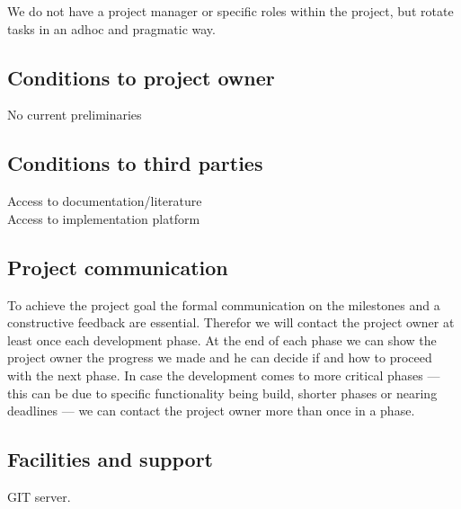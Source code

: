 \documentclass{article}
\begin{document}
We do not have a project manager or specific roles within the project, but
rotate tasks in an adhoc and pragmatic way.

\subsection{Conditions to project owner}
No current preliminaries

\subsection{Conditions to third parties}

Access to documentation/literature\\
Access to implementation platform

\subsection{Project communication}

To achieve the project goal the formal communication on the milestones and a
constructive feedback are essential. Therefor we will contact the project owner
at least once each development phase. At the end of each phase we can show the
project owner the progress we made and he can decide if and how to proceed with
the next phase. In case the development comes to more critical phases --- this
can be due to specific functionality being build, shorter phases or nearing
deadlines --- we can contact the project owner more than once in a phase.

\subsection{Facilities and support}

GIT server.
\end{document}
